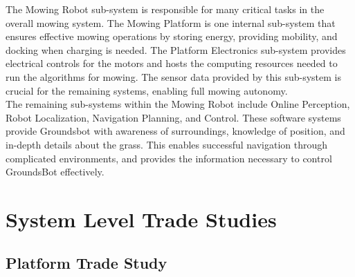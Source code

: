 \documentclass[12pt]{extarticle}
\begin{document}
  The Mowing Robot sub-system is responsible for many critical tasks in the overall mowing system. The Mowing Platform is one internal sub-system that ensures effective mowing operations by storing energy, providing mobility, and docking when charging is needed. The Platform Electronics sub-system provides electrical controls for the motors and hosts the computing resources needed to run the algorithms for mowing. The sensor data provided by this sub-system is crucial for the remaining systems, enabling full mowing autonomy.\\
  
  The remaining sub-systems within the Mowing Robot include Online Perception, Robot Localization, Navigation Planning, and Control. These software systems provide Groundsbot with awareness of surroundings, knowledge of position, and in-depth details about the grass. This enables successful navigation through complicated environments, and provides the information necessary to control GroundsBot effectively.\\

\newpage
\section{System Level Trade Studies}
	\subsection{Platform Trade Study}
\end{document}
